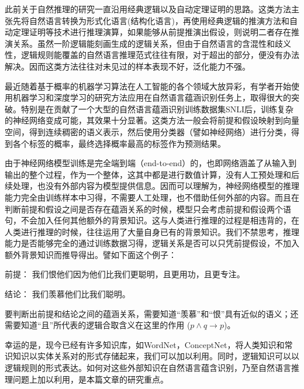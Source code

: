\documentclass[UTF8,11pt,a4paper,nofonts]{ctexart}
\numberwithin{equation}{section}
\begin{document}



此前关于自然推理的研究一直沿用经典逻辑以及自动定理证明的思路。这类方法主张先将自然语言转换为形式化语言(结构化语言)，再使用经典逻辑的推演方法和自动定理证明等技术进行推理演算，如果能够从前提推演出假设，则说明二者存在推演关系。虽然一阶逻辑能刻画生成的逻辑关系，但由于自然语言的含混性和歧义性，逻辑规则能覆盖的自然语言推理范式往往有限，对于超出的部分，便没有办法解决。因而这类方法往往对未见过的样本表现不好，泛化能力不强。

最近随着基于概率的机器学习算法在人工智能的各个领域大放异彩，有学者开始使用机器学习和深度学习的研究方法应用在自然语言蕴涵识别任务上，取得很大的突破。特别是在\cite{Bowman2015ALA}贡献了一个大型的自然语言蕴涵识别训练数据集SNLI后，训练复杂的神经网络变成可能，其效果十分显著。这类方法一般会将前提和假设映射到向量空间，得到连续稠密的语义表示，然后使用分类器（譬如神经网络）进行分类，得到各个标签的概率，最终选择概率最高的标签作为预测结果。

由于神经网络模型训练是完全端到端（end-to-end）\cite{Sutskever2014SequenceTS}的，也即网络涵盖了从输入到输出的整个过程，作为一个整体，这其中都是进行数值计算，没有人工预处理和后续处理，也没有外部内容为模型提供信息。因而可以理解为，神经网络模型的推理能力完全由训练样本中习得，不需要人工处理，也不借助任何外部的内容。而且在判断前提和假设之间是否存在蕴涵关系的时候，模型只会考虑前提和假设两个语句，不会加入任何其他额外的背景知识。这与人类进行推理的过程是相违背的，在人类进行推理的时候，往往运用了大量自身已有的背景知识。我们不禁思考，推理能力是否能够完全的通过训练数据习得，逻辑关系是否可以只凭前提假设，不加入额外背景知识而推导得出。譬如下面这个例子：


前提： 我们恨他们因为他们比我们更聪明，且更用功，且更专注。

结论： 我们羡慕他们比我们聪明。

要判断出前提和结论之间的蕴涵关系，需要知道“羡慕”和“恨”具有近似的语义；还需要知道“且”所代表的逻辑合取含义在这里的作用
($p \land q \to p$)。

幸运的是，现今已经有许多知识库，如WordNet，ConceptNet\cite{Speer2012RepresentingGR}，将人类知识和常识知识以实体关系对的形式存储起来，我们可以加以利用。同时，逻辑知识可以以逻辑规则的形式表达。如何对这些外部知识在自然语言蕴含识别，乃至自然语言推理问题上加以利用，是本篇文章的研究重点。
\end{document}
